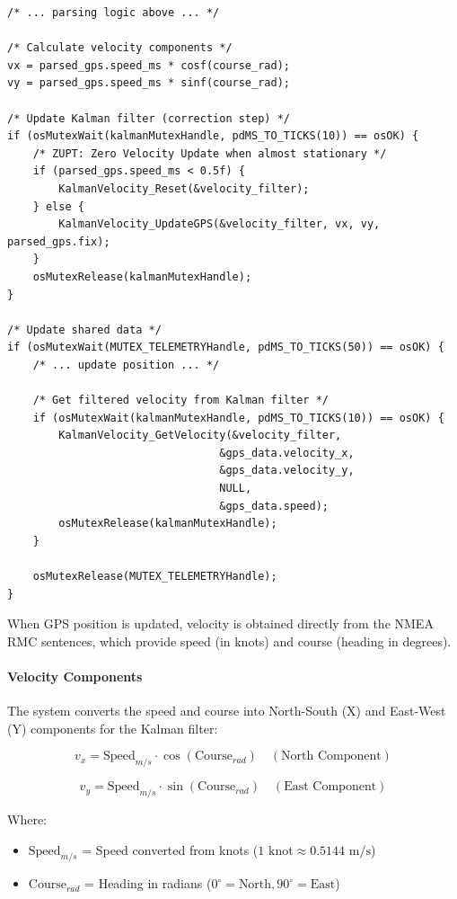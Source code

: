 \documentclass[11pt,a4paper]{article}
\begin{document}
\begin{lstlisting}[caption=GPS Task with Kalman Fusion and ZUPT, label=lst:gpsfusion]
/* ... parsing logic above ... */

/* Calculate velocity components */
vx = parsed_gps.speed_ms * cosf(course_rad);
vy = parsed_gps.speed_ms * sinf(course_rad);

/* Update Kalman filter (correction step) */
if (osMutexWait(kalmanMutexHandle, pdMS_TO_TICKS(10)) == osOK) {
    /* ZUPT: Zero Velocity Update when almost stationary */
    if (parsed_gps.speed_ms < 0.5f) {
        KalmanVelocity_Reset(&velocity_filter);
    } else {
        KalmanVelocity_UpdateGPS(&velocity_filter, vx, vy, parsed_gps.fix);
    }
    osMutexRelease(kalmanMutexHandle);
}

/* Update shared data */
if (osMutexWait(MUTEX_TELEMETRYHandle, pdMS_TO_TICKS(50)) == osOK) {
    /* ... update position ... */
    
    /* Get filtered velocity from Kalman filter */
    if (osMutexWait(kalmanMutexHandle, pdMS_TO_TICKS(10)) == osOK) {
        KalmanVelocity_GetVelocity(&velocity_filter, 
                                 &gps_data.velocity_x,
                                 &gps_data.velocity_y, 
                                 NULL, 
                                 &gps_data.speed);
        osMutexRelease(kalmanMutexHandle);
    }
    
    osMutexRelease(MUTEX_TELEMETRYHandle);
}
\end{lstlisting}
When GPS position is updated, velocity is obtained directly from the NMEA RMC sentences, which provide speed (in knots) and course (heading in degrees).

\paragraph{Velocity Components}
The system converts the speed and course into North-South (X) and East-West (Y) components for the Kalman filter:

\begin{equation}
v_x = \text{Speed}_{m/s} \cdot \cos(\text{Course}_{rad}) \quad (\text{North Component})
\end{equation}

\begin{equation}
v_y = \text{Speed}_{m/s} \cdot \sin(\text{Course}_{rad}) \quad (\text{East Component})
\end{equation}

Where:
\begin{itemize}
    \item $\text{Speed}_{m/s}$ = Speed converted from knots ($1 \text{ knot} \approx 0.5144 \text{ m/s}$)
    \item $\text{Course}_{rad}$ = Heading in radians ($0^\circ = \text{North}, 90^\circ = \text{East}$)
\end{itemize}
\end{document}
